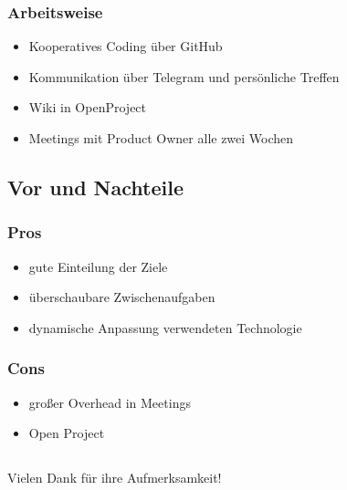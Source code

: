 \documentclass[11pt]{beamer}
\begin{document}
 
 \begin{frame}
 \frametitle{Arbeitsweise}
 \begin{itemize}
 	\item Kooperatives Coding über GitHub
 	\item Kommunikation über Telegram und persönliche Treffen
 	\item Wiki in OpenProject
 	 \item Meetings mit Product Owner alle zwei Wochen
 \end{itemize}
\end{frame}




\subsection{Vor und Nachteile}
 
 \begin{frame}
 \frametitle{Pros}
 \begin{itemize}
 	\item gute Einteilung der Ziele
 	\item überschaubare Zwischenaufgaben
 	\item dynamische Anpassung verwendeten Technologie
 \end{itemize}
\end{frame}


 \begin{frame}
\frametitle{Cons}
\begin{itemize}
	\item großer Overhead in Meetings
	\item Open Project
\end{itemize}
\end{frame}

\subsection{}

\begin{frame}

	Vielen Dank für ihre Aufmerksamkeit!

\end{frame}
\end{document}
